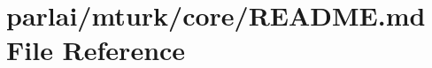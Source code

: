 \hypertarget{parlai_2mturk_2core_2README_8md}{}\section{parlai/mturk/core/\+R\+E\+A\+D\+ME.md File Reference}
\label{parlai_2mturk_2core_2README_8md}
